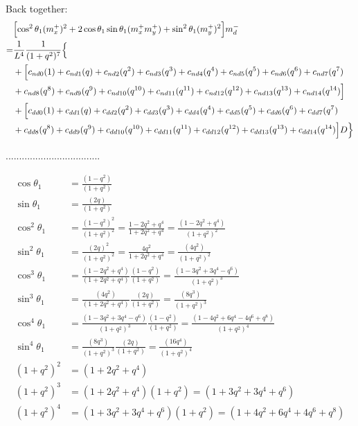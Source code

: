 \documentclass[12pt]{article}
\begin{document}
Back together:
\begin{align}
    &\Bigl[ \cos^2\theta_1(m_x^+)^2  + 2\cos\theta_1\sin\theta_1(m_x^+m_y^+)  +\sin^2\theta_1(m_y^+)^2 \Bigr] m_d^-\\
    =& \frac{1}{L^4} \frac{1}{(1+q^2)^7} \Bigl\{ \nonumber\\
    &+ \Bigl[ c_{nd0}(1) + c_{nd1}(q) + c_{nd2}(q^2) + c_{nd3}(q^3) + c_{nd4}(q^4) + c_{nd5}(q^5) + c_{nd6}(q^6) + c_{nd7}(q^7) \nonumber\\
    &+ c_{nd8}(q^8) + c_{nd9}(q^9) + c_{nd10}(q^{10}) + c_{nd11}(q^{11}) + c_{nd12}(q^{12}) + c_{nd13}(q^{13}) + c_{nd14}(q^{14}) \Bigr] \nonumber\\
    &+ \Bigl[  c_{dd0}(1) + c_{dd1}(q) + c_{dd2}(q^2) + c_{dd3}(q^3) + c_{dd4}(q^4) + c_{dd5}(q^5) + c_{dd6}(q^6) + c_{dd7}(q^7) \nonumber\\
    &+ c_{dd8}(q^8) + c_{dd9}(q^9) + c_{dd10}(q^{10}) + c_{dd11}(q^{11}) + c_{dd12}(q^{12}) + c_{dd13}(q^{13}) + c_{dd14}(q^{14}) \Bigr]D  \Bigr\}
\end{align}


...................................



\begin{align}
    \cos\theta_1 &= \frac{(1-q^2)}{(1+q^2)}\\
    \sin\theta_1 &= \frac{(2q)}{(1+q^2)}\\
    \cos^2\theta_1 &= \frac{(1-q^2)^2}{(1+q^2)^2} = \frac{1-2q^2+q^4}{1+2q^2+q^4} = \frac{(1-2q^2+q^4)}{(1+q^2)^2}\\
    \sin^2\theta_1 &= \frac{(2q)^2}{(1+q^2)^2} = \frac{4q^2}{1+2q^2+q^4} = \frac{(4q^2)}{(1+q^2)^2}\\
    \cos^3\theta_1 &= \frac{(1-2q^2+q^4)}{(1+2q^2+q^4)}\frac{(1-q^2)}{(1+q^2)} = \frac{(1-3q^2+3q^4-q^6)}{(1+q^2)^3}\\
    \sin^3\theta_1 &= \frac{(4q^2)}{(1+2q^2+q^4)}\frac{(2q)}{(1+q^2)} = \frac{(8q^3)}{(1+q^2)^3}\\
    \cos^4\theta_1 &= \frac{(1-3q^2+3q^4-q^6)}{(1+q^2)^3}\frac{(1-q^2)}{(1+q^2)} =\frac{(1-4q^2+ 6q^4-4q^6+q^8)}{(1+q^2)^4}\\
    \sin^4\theta_1 &= \frac{(8q^3)}{(1+q^2)^3}\frac{(2q)}{(1+q^2)} = \frac{(16q^4)}{(1+q^2)^4}\\
    (1+q^2)^2 &= (1+2q^2+q^4)\\
    (1+q^2)^3 &= (1+2q^2+q^4)(1+q^2) = (1+3q^2+3q^4+q^6)\\
    (1+q^2)^4 &= (1+3q^2+3q^4+q^6)(1+q^2) = (1+4q^2+6q^4 +4q^6+q^8)
\end{align}
\end{document}
